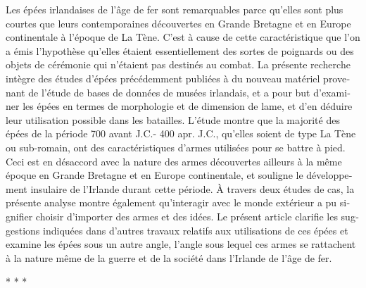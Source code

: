 \begin{myabstract}
\foreignlanguage{french}{%
	Les  épées irlandaises de l’âge de fer sont remarquables parce qu’elles sont plus courtes que leurs contemporaines découvertes en Grande Bretagne et en Europe continentale à l’époque de La Tène. C’est à cause de cette caractéristique que l’on a émis l’hypothèse qu’elles étaient essentiellement des sortes de poignards ou des objets de cérémonie qui n’étaient pas destinés au combat. La présente recherche intègre des études d’épées précédemment publiées à du nouveau matériel provenant de l’étude de bases de données de musées irlandais, et a pour but d’examiner les épées en termes de morphologie et de dimension de lame, et d’en déduire leur utilisation possible dans les batailles. L’étude montre que la majorité des épées de la période 700 avant J.C.- 400 apr. J.C., qu’elles soient de type La Tène ou sub-romain, ont des caractéristiques d’armes utilisées pour se battre à pied.  Ceci est en désaccord avec la nature des armes découvertes ailleurs à la même époque en Grande Bretagne et en Europe continentale, et souligne le développement insulaire de l’Irlande durant cette période. À travers deux études de cas, la présente analyse montre également qu’interagir avec le monde extérieur a pu signifier choisir d’importer des armes et des idées. Le présent article clarifie les suggestions indiquées dans d’autres travaux relatifs aux utilisations de ces épées et examine les épées sous un autre angle, l’angle sous lequel ces armes se rattachent à la nature même de la guerre et de la société dans l’Irlande de l’âge de fer.}
\end{myabstract}

\begin{center}
	* * *
\end{center}%

